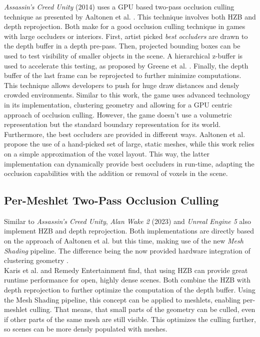 \noindent
\emph{Assassin's Creed Unity} (2014) uses a \ac{GPU} based two-pass occlusion culling technique as presented by 
Aaltonen et al. \cite{Aaltonen2015}. This technique involves both \ac{HZB} and depth reprojection. Both make for 
a good occlusion culling technique in games with large occluders or interiors. First, artist picked 
\emph{best occluders} are drawn to the depth buffer in a depth pre-pass. Then, projected bounding boxes can be 
used to test visibility of smaller objects in the scene. A hierarchical z-buffer is used to accelerate this testing,
as proposed by Greene et al. \cite{Greene93,Greene95}. Finally, the depth buffer of the last frame can be 
reprojected to further minimize computations. This technique allows developers to push for huge draw distances 
and densly crowded environments. Similar to this work, the game uses advanced technology in its implementation, 
clustering geometry and allowing for a \ac{GPU} centric approach of occlusion culling. However, the game doesn't 
use a volumetric representation but the standard boundary representation for its world. Furthermore, the best 
occluders are provided in different ways. Aaltonen et al. \cite{Aaltonen2015} propose the use of a hand-picked 
set of large, static meshes, while this work relies on a simple approximation of the voxel layout. This way, 
the latter implementation can dynamically provide best occluders in run-time, adapting the occlusion capabilities 
with the addition or removal of voxels in the scene.\\

\subsection*{Per-Meshlet Two-Pass Occlusion Culling}

Similar to \emph{Assassin's Creed Unity}, \emph{Alan Wake 2} (2023) and \emph{Unreal Engine 5} also implement \ac{HZB} 
and depth reprojection. Both implementations are directly based on the approach of Aaltonen et al. \cite{Aaltonen2015} 
but this time, making use of the new \emph{Mesh Shading} pipeline. The difference being the now provided hardware 
integration of clustering geometry \cite{Remedy2023,Karis2021}.  \\

\noindent
Karis et al. and Remedy Entertainment find, that using \ac{HZB} can provide great runtime performance for open, 
highly dense scenes. Both combine the \ac{HZB} with depth reprojection to further optimize the computation of the 
depth buffer. Using the Mesh Shading pipeline, this concept can be applied to meshlets, enabling per-meshlet culling. 
That means, that small parts of the geometry can be culled, even if other parts of the same mesh are still visible. 
This optimizes the culling further, so scenes can be more densly populated with meshes.\\

